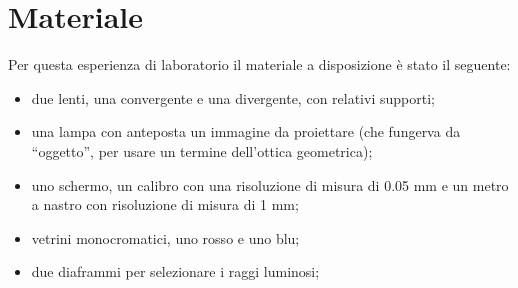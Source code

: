 \section{Materiale}

Per questa esperienza di laboratorio il materiale a disposizione è stato il seguente:
\begin{itemize}
	\item{due lenti, una convergente e una divergente, con relativi supporti;}
    \item{una lampa con anteposta un immagine da proiettare (che fungerva da ``oggetto'', per usare un termine dell'ottica geometrica);}
	\item{uno schermo, un calibro con una risoluzione di misura di 0.05 mm e un metro a nastro con risoluzione di misura di 1 mm;}
	\item{vetrini monocromatici, uno rosso e uno blu;}
	\item{due diaframmi per selezionare i raggi luminosi;}
\end{itemize}
